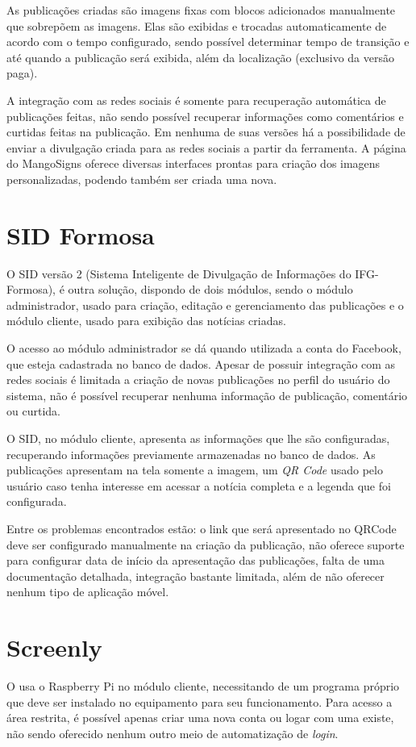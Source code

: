 As publicações criadas são imagens fixas com blocos adicionados manualmente que sobrepõem as imagens. Elas são exibidas e trocadas automaticamente de acordo com o tempo configurado, sendo possível determinar tempo de transição e até quando a publicação será exibida, além da localização (exclusivo da versão paga). 

A integração com as redes sociais é somente para recuperação automática de publicações feitas, não sendo possível recuperar informações como comentários e curtidas feitas na publicação. Em nenhuma de suas versões há a possibilidade de enviar a divulgação criada para as redes sociais a partir da ferramenta. A página do MangoSigns oferece diversas interfaces prontas para criação dos imagens personalizadas, podendo também ser criada uma nova. 

\section{SID Formosa}
\label{sec:sid}
O SID versão 2 (Sistema Inteligente de Divulgação de Informações do IFG-Formosa), é outra solução, dispondo de dois módulos, sendo o módulo administrador, usado para criação, editação e gerenciamento das publicações e o módulo cliente, usado para exibição das notícias criadas.

O acesso ao módulo administrador se dá quando utilizada a conta do Facebook, que esteja cadastrada no banco de dados. Apesar de possuir integração com as redes sociais é limitada a criação de novas publicações no perfil do usuário do sistema, não é possível recuperar nenhuma informação de publicação, comentário ou curtida.

O SID, no módulo cliente, apresenta as informações que lhe são configuradas, recuperando informações previamente armazenadas no banco de dados. As publicações apresentam na tela somente a imagem, um \textit{QR Code} usado pelo usuário caso tenha interesse em acessar a notícia completa e a legenda que foi configurada. \citet{sobrinho2017}

Entre os problemas encontrados estão: o link que será apresentado no QRCode deve ser configurado manualmente na criação da publicação, não oferece suporte para configurar data de início da apresentação das publicações, falta de uma documentação detalhada, integração bastante limitada, além de não oferecer nenhum tipo de aplicação móvel.

\section{Screenly}
O \citet{screenly2017} usa o Raspberry Pi no módulo cliente, necessitando de um programa próprio que deve ser instalado no equipamento para seu funcionamento. Para acesso a área restrita, é possível apenas criar uma nova conta ou logar com uma existe, não sendo oferecido nenhum outro meio de automatização de \textit{login}. 


